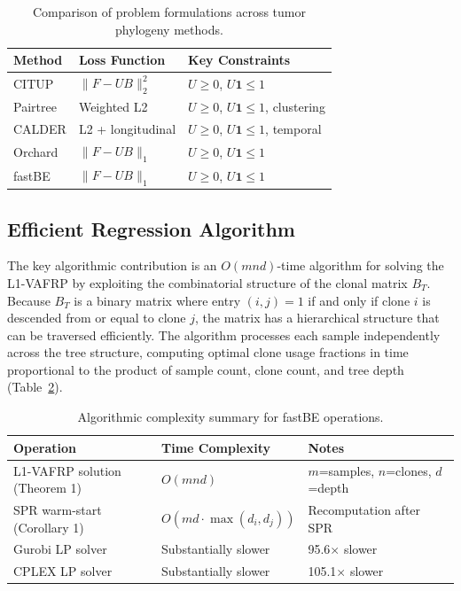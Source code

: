 \documentclass[11pt]{article}
\begin{document}
\begin{table}[htbp]
\centering
\caption{Comparison of problem formulations across tumor phylogeny methods.}
\label{tab:formulations}
\begin{tabular}{lll}
\toprule
Method & Loss Function & Key Constraints \\
\midrule
CITUP & $\|F - UB\|_2^2$ & $U \geq 0$, $U\mathbf{1} \leq 1$ \\
Pairtree & Weighted L2 & $U \geq 0$, $U\mathbf{1} \leq 1$, clustering \\
CALDER & L2 + longitudinal & $U \geq 0$, $U\mathbf{1} \leq 1$, temporal \\
Orchard & $\|F - UB\|_1$ & $U \geq 0$, $U\mathbf{1} \leq 1$ \\
fastBE & $\|F - UB\|_1$ & $U \geq 0$, $U\mathbf{1} \leq 1$ \\
\bottomrule
\end{tabular}
\end{table}

\subsection{Efficient Regression Algorithm}

The key algorithmic contribution is an $O(mnd)$-time algorithm for solving the L1-VAFRP by exploiting the combinatorial structure of the clonal matrix $B_T$. Because $B_T$ is a binary matrix where entry $(i,j) = 1$ if and only if clone $i$ is descended from or equal to clone $j$, the matrix has a hierarchical structure that can be traversed efficiently. The algorithm processes each sample independently across the tree structure, computing optimal clone usage fractions in time proportional to the product of sample count, clone count, and tree depth (Table~\ref{tab:complexity}).

\begin{table}[htbp]
\centering
\caption{Algorithmic complexity summary for fastBE operations.}
\label{tab:complexity}
\begin{tabular}{lll}
\toprule
Operation & Time Complexity & Notes \\
\midrule
L1-VAFRP solution (Theorem 1) & $O(mnd)$ & $m$=samples, $n$=clones, $d$=depth \\
SPR warm-start (Corollary 1) & $O(md \cdot \max(d_i, d_j))$ & Recomputation after SPR \\
Gurobi LP solver & Substantially slower & 95.6$\times$ slower \\
CPLEX LP solver & Substantially slower & 105.1$\times$ slower \\
\bottomrule
\end{tabular}
\end{table}
\end{document}
